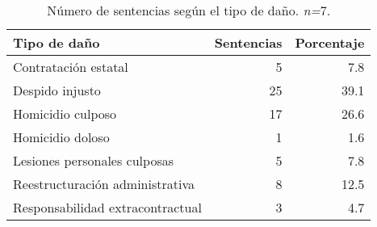 \begin{table}[!htbp]
\centering
\caption{Número de sentencias según el tipo de daño. \textit{n=}7.} 
\label{tab:dano}
\begin{tabular}{lrr}
  \hline
Tipo de daño & Sentencias & Porcentaje \\ 
  \hline
Contratación estatal &  5 & 7.8 \\ 
  Despido injusto & 25 & 39.1 \\ 
  Homicidio culposo & 17 & 26.6 \\ 
  Homicidio doloso &  1 & 1.6 \\ 
  Lesiones personales culposas &  5 & 7.8 \\ 
  Reestructuración administrativa &  8 & 12.5 \\ 
  Responsabilidad extracontractual &  3 & 4.7 \\ 
   \hline
\end{tabular}
\end{table}
